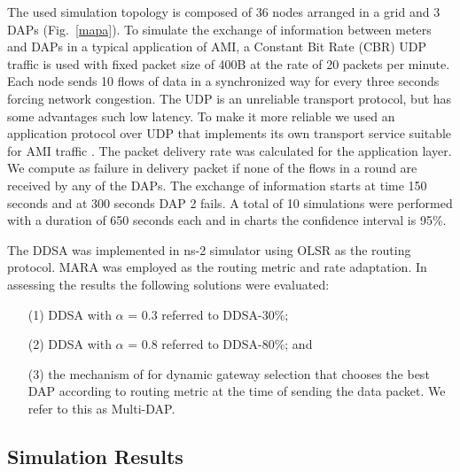 \documentclass[conference]{IEEEtran}
\begin{document}
The used simulation topology is composed of 36 nodes arranged in a grid and 3 DAPs (Fig.~\ref{mapa}). To simulate the exchange of information between meters and DAPs in a typical application of AMI, a Constant Bit Rate (CBR) UDP traffic is used with fixed packet size of 400B \cite{Plan2011} at the rate of 20 packets per minute. Each node sends 10 flows of data in a synchronized way for every three seconds forcing network congestion. The UDP is an unreliable transport protocol, but has some advantages such low latency. To make it more reliable we used an application protocol over UDP that implements its own transport service suitable for AMI traffic \cite{RFC6272}. The packet delivery rate was calculated for the application layer. We compute as failure in delivery packet if none of the flows in a round are received by any of the DAPs. The exchange of information starts at time 150 seconds and at 300 seconds  DAP 2 fails. A total of 10 simulations were performed with a duration of 650 seconds each and in charts the confidence interval is 95\%.

The DDSA was implemented in ns-2 simulator using OLSR \cite{clausen2003optimized} as the routing protocol. MARA \cite{6051505} was employed as the routing metric and rate adaptation. In assessing the results the following solutions were evaluated:

\begin{itemize}
  \item[(1)] DDSA with $\alpha$ = 0.3 referred to DDSA-30\%;
  \item[(2)] DDSA with $\alpha$ = 0.8 referred to DDSA-80\%; and
  \item[(3)] the mechanism of \cite{Silva2010} for dynamic gateway selection that chooses the best DAP  according to routing metric at the time of sending the data packet. We refer to this as Multi-DAP.
\end{itemize}


\subsection{Simulation Results}
\end{document}

